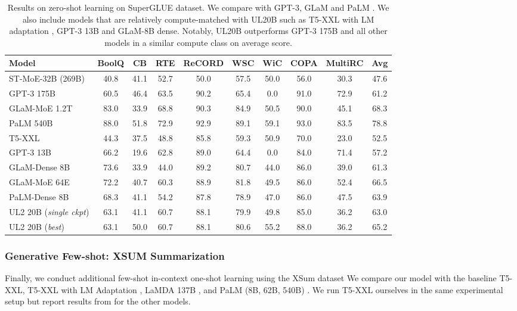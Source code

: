 \documentclass[10pt]{article}
\begin{document}
\begin{table*}[h!]
    \centering
       \caption{Results on zero-shot learning on SuperGLUE dataset. We compare with GPT-3, GLaM and PaLM \citep{chowdhery2022palm}. We also include models that are relatively compute-matched with UL20B such as T5-XXL with LM adaptation \citep{lester2021power}, GPT-3 13B and GLaM-8B dense. Notably, UL20B outperforms GPT-3 175B and all other models in a similar compute class on average score.}
    \label{tab:my_label}
    \small
    \begin{tabular}{lccccccccc}
    \toprule
    Model & BoolQ & CB & RTE & ReCORD & WSC & WiC & COPA & MultiRC & Avg \\ 
    \midrule
    ST-MoE-32B (269B) & 40.8 & 41.1 & 52.7 & 50.0 & 57.5 & 50.0 &56.0 & 30.3 & 47.6 \\
     GPT-3 175B    &  60.5 &	46.4&	63.5&	90.2&	65.4&	0.0 &	91.0 &	72.9 &	61.2\\
       GLaM-MoE 1.2T   & 83.0 &	33.9 &	68.8 &		90.3 &		84.9&		50.5&		90.0&		45.1&		68.3\\
       PaLM 540B & 88.0	& 51.8 &	72.9 &	92.9 &	89.1 &	59.1 &	93.0 &	83.5 &	78.8\\
       \midrule
       T5-XXL & 44.3 & 	37.5 &	48.8 &	85.8 &	59.3 &	50.9 &	70.0 &	23.0 &	52.5\\
       GPT-3 13B & 66.2	& 19.6 & 	62.8 & 	89.0	& 64.4& 	0.0 & 	84.0 & 	71.4& 	57.2 \\
        GLaM-Dense 8B & 73.6 & 	33.9 &	44.0 &	89.2 &	80.7 &	44.0 &	86.0 & 	39.0 &	61.3\\
        GLaM-MoE 64E & 72.2	& 40.7 & 	60.3 & 	88.9 &	81.8 & 	49.5 & 	86.0	& 52.4 &	66.5\\
        PaLM-Dense 8B & 68.3 &	41.1&	54.2&	87.8&	78.9&	47.0&	86.0&	47.5&	63.9 \\
        \midrule
        UL2 20B (\textit{single ckpt}) & 63.1 & 	41.1 &	60.7 &	88.1 &	79.9 &	49.8&	85.0 &	36.2&	63.0 \\
       UL2 20B (\textit{best}) & 63.1 &	50.0 &	60.7	& 88.1 &	80.6 &	55.2 &	88.0	& 36.2 &	65.2\\
      
       \bottomrule
    \end{tabular}
 
\end{table*}


\subsubsection{Generative Few-shot: XSUM Summarization}
Finally, we conduct additional few-shot in-context one-shot learning using the XSum dataset We compare our model with the baseline T5-XXL, T5-XXL with LM Adaptation \citep{lester2021power}, LaMDA 137B \citep{thoppilan2022lamda}, and PaLM (8B, 62B, 540B) \citep{chowdhery2022palm}. We run T5-XXL ourselves in the same experimental setup but report results from \citep{chowdhery2022palm} for the other models.
\end{document}
